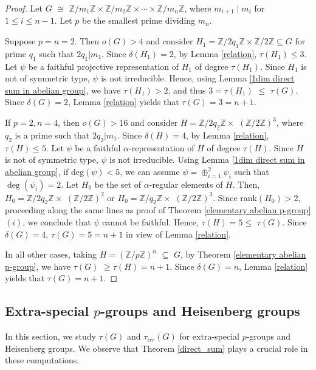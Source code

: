 \documentclass[a4paper,11pt]{amsart}
\numberwithin{equation}{section}
\numberwithin{equation}{subsection}
\newcommand{\Z}{\mathbb{Z}}
\newcommand{\tg}{\tau(G)}
\newcommand{\poonam}[1]{{\color{blue} #1}}
\begin{document}
\begin{proof}
	Let $G$ $\cong$ $\mathbb{Z}/{m_1}\Z \times \mathbb{Z}/{m_2}\Z \times \cdots \times \mathbb{Z}/{m_n}\Z$, where $m_{i+1} \mid m_i$ for $1 \leq i \leq n-1$. Let $p$ be the smallest prime dividing $m_n$. 
	
	Suppose $p = n= 2$. Then $o(G) > 4$ and consider $H_1 = \Z/2q_1\Z \times \Z/2\Z \subseteq G$ for prime $q_1$ such that $2q_1|m_1$. Since $\delta(H_1)= 2$, by Lemma \ref{relation}, $\tau(H_1) \leq 3$. Let $\psi$ be a faithful projective representation of $H_1$ of degree $\tau(H_1)$. Since $H_1$ is not of symmetric type, $\psi$ is not irreducible. Hence, using Lemma \ref{1dim direct sum in abelian group}, we have $\tau(H_1) >2$, and thus $3 =\tau(H_1)$ $\leq$ $\tau(G)$. Since $\delta(G)= 2$, Lemma \ref{relation} yields that $\tg = 3= n+1$. %
	
	If $p =2, n= 4$, then $o(G) > 16$ and consider $H = \Z/2q_2\Z \times$ $(\Z/2\Z)^3$, where $q_2$ is a prime such that $2q_2|m_1$. Since $\delta(H)= 4$, by Lemma \ref{relation},  $\tau(H) \leq 5$. Let $\psi$ be a faithful $\alpha$-representation of $H$ of degree $\tau(H)$. 
	Since $H$ is not of symmetric type, $\psi$ is not irreducible. Using Lemma \ref{1dim direct sum in abelian group}, if deg$(\psi) <5$, we can assume $\psi= \oplus_{i=1}^2\psi_i$ such that $\operatorname{deg}(\psi_i)=2$. Let $H_0$ be the set of $\alpha$-regular elements of $H$. Then, $H_0= \Z/2q_2\Z \times$ $(\Z/2\Z)^2$ or $H_0= \Z/q_2\Z \times$ $(\Z/2\Z)^3$. Since rank$(H_0)>2$, proceeding along the same lines as proof of Theorem \ref{elementary abelian p-group}$(i)$, we conclude that $\psi$ cannot be faithful. Hence, $\tau(H) = 5 \leq$ $\tau(G)$. Since $\delta(G)= 4$, $\tg = 5= n+1$ in view of Lemma \ref{relation}. 
	
	In all other cases, taking $H = (\Z/p\Z)^n$ $\subseteq$ $G$, by Theorem \ref{elementary abelian p-group}, we have $\tau(G)$ $\geq \tau(H) = n + 1$. Since $\delta(G)= n$, Lemma \ref{relation} yields that $\tg = n + 1$. %
	
\end{proof}

\subsection{Extra-special $p$-groups and Heisenberg groups} \label{EH} 
In this section, we study $\tau(G)$ and $\tau_{irr}(G)$ for extra-special $p$-groups and Heisenberg groups. We observe that Theorem \ref{direct_sum} plays a crucial role in these computations.
\end{document}
